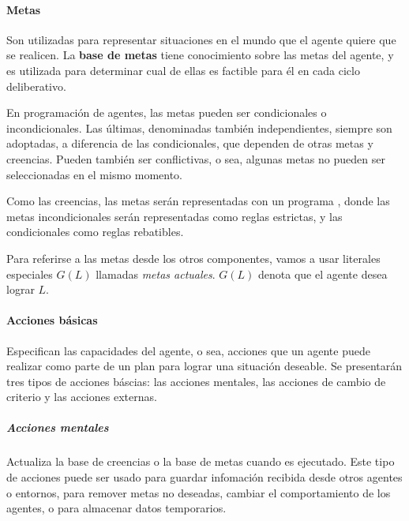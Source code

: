 \paragraph{Metas}

Son utilizadas para representar situaciones en el mundo que el agente quiere
que se realicen. La \textbf{base de metas} tiene conocimiento sobre las metas
del agente, y es utilizada para determinar cual de ellas es factible para él 
en cada ciclo deliberativo.

En programación de agentes, las metas pueden ser condicionales o 
incondicionales. Las últimas, denominadas también independientes, siempre son
adoptadas, a diferencia de las condicionales, que dependen de otras metas y 
creencias. Pueden también ser conflictivas, o sea, algunas metas no pueden
ser seleccionadas en el mismo momento. 

Como las creencias, las metas serán representadas con un programa \DLP, donde
las metas incondicionales serán representadas como reglas estrictas, y las 
condicionales como reglas rebatibles. 
%

Para referirse a las metas desde los otros componentes, vamos a usar literales
especiales $G(L)$ llamadas \textit{metas actuales}. $G(L)$ denota que el agente
desea lograr $L$.

\paragraph{Acciones básicas}

Especifican las capacidades del agente, o sea, acciones que un agente puede realizar como parte de un
plan para lograr una situación deseable. Se presentarán tres tipos de acciones báscias: las acciones
mentales, las acciones de cambio de criterio y las acciones externas.

\subparagraph{Acciones mentales}

Actualiza la base de creencias o la base de metas cuando es ejecutado. Este tipo de acciones puede ser
usado para guardar infomación recibida desde otros agentes o entornos, para remover metas no deseadas,
cambiar el comportamiento de los agentes, o para almacenar datos temporarios.

